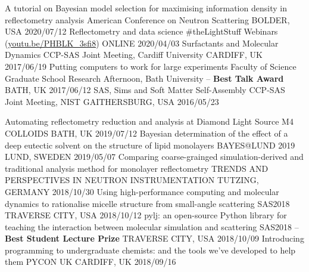 \vspace{-0.4cm}
\begin{cvhonors}
  \cvhonor
    {A tutorial on Bayesian model selection for maximising information density in reflectometry analysis}
    {American Conference on Neutron Scattering}
    {BOLDER, USA}
    {2020/07/12}
  \cvhonor
    {Reflectometry and data science}
    {\#theLightStuff Webinars (\href{https://youtu.be/PHBLK_3sfi8}{youtu.be/PHBLK\_3sfi8})}
    {ONLINE}
    {2020/04/03}
  \cvhonor
    {Surfactants and Molecular Dynamics}
    {CCP-SAS Joint Meeting, Cardiff University}
    {CARDIFF, UK}
    {2017/06/19}
  \cvhonor
  	{Putting computers to work for large experiments}
    {Faculty of Science Graduate School Research Afternoon, Bath University -- \textbf{Best Talk Award}}
    {BATH, UK}
    {2017/06/12}
  \cvhonor
    {SAS, Sims and Soft Matter Self-Assembly}
    {CCP-SAS Joint Meeting, NIST}
    {GAITHERSBURG, USA}
    {2016/05/23}
\end{cvhonors}
\begin{cvhonors}
  \cvhonor
    {Automating reflectometry reduction and analysis at Diamond Light Source}
    {M4 COLLOIDS}
    {BATH, UK}
    {2019/07/12}
  \cvhonor
    {Bayesian determination of the effect of a deep eutectic solvent on the structure of lipid monolayers}
    {BAYES@LUND 2019}
    {LUND, SWEDEN}
    {2019/05/07}
  \cvhonor
    {Comparing coarse-grainged simulation-derived and traditional analysis method for monolayer reflectometry}
    {TRENDS AND PERSPECTIVES IN NEUTRON INSTRUMENTATION}
    {TUTZING, GERMANY}
    {2018/10/30}
  \cvhonor
    {Using high-performance computing and molecular dynamics to rationalise micelle structure from small-angle scattering}
    {SAS2018}
    {TRAVERSE CITY, USA}
    {2018/10/12}
  \cvhonor
    {pylj: an open-source Python library for teaching the interaction between molecular simulation and scattering}
	{SAS2018 -- \textbf{Best Student Lecture Prize}}
    {TRAVERSE CITY, USA}
    {2018/10/09}
  \cvhonor
    {Introducing programming to undergraduate chemists: and the tools we've developed to help them}
    {PYCON UK}
    {CARDIFF, UK}
    {2018/09/16}
\end{cvhonors}
